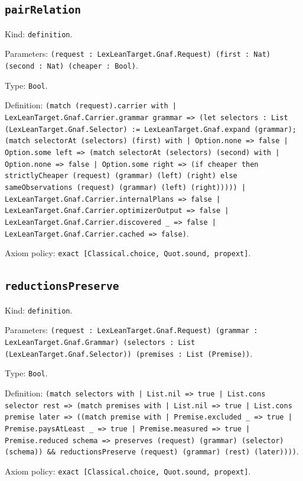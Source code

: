 \documentclass[11pt]{article}
\begin{document}
\subsection*{\texttt{pairRelation}}
\noindent Kind: \texttt{definition}.\par
\noindent Parameters: \texttt{(request : LexLeanTarget.Gnaf.Request) (first : Nat) (second : Nat) (cheaper : Bool)}.\par
\noindent Type: \texttt{Bool}.\par
\noindent Definition: \texttt{(match (request).carrier with | LexLeanTarget.Gnaf.Carrier.grammar grammar => (let selectors : List (LexLeanTarget.Gnaf.Selector) := LexLeanTarget.Gnaf.expand (grammar); (match selectorAt (selectors) (first) with | Option.none => false | Option.some left => (match selectorAt (selectors) (second) with | Option.none => false | Option.some right => (if cheaper then strictlyCheaper (request) (grammar) (left) (right) else sameObservations (request) (grammar) (left) (right))))) | LexLeanTarget.Gnaf.Carrier.internalPlans => false | LexLeanTarget.Gnaf.Carrier.optimizerOutput => false | LexLeanTarget.Gnaf.Carrier.discovered \_ => false | LexLeanTarget.Gnaf.Carrier.cached => false)}.\par
\noindent Axiom policy: \texttt{exact [Classical.choice, Quot.sound, propext]}.\par
\subsection*{\texttt{reductionsPreserve}}
\noindent Kind: \texttt{definition}.\par
\noindent Parameters: \texttt{(request : LexLeanTarget.Gnaf.Request) (grammar : LexLeanTarget.Gnaf.Grammar) (selectors : List (LexLeanTarget.Gnaf.Selector)) (premises : List (Premise))}.\par
\noindent Type: \texttt{Bool}.\par
\noindent Definition: \texttt{(match selectors with | List.nil => true | List.cons selector rest => (match premises with | List.nil => true | List.cons premise later => ((match premise with | Premise.excluded \_ => true | Premise.paysAtLeast \_ => true | Premise.measured => true | Premise.reduced schema => preserves (request) (grammar) (selector) (schema)) \&\& reductionsPreserve (request) (grammar) (rest) (later))))}.\par
\noindent Axiom policy: \texttt{exact [Classical.choice, Quot.sound, propext]}.\par
\end{document}
